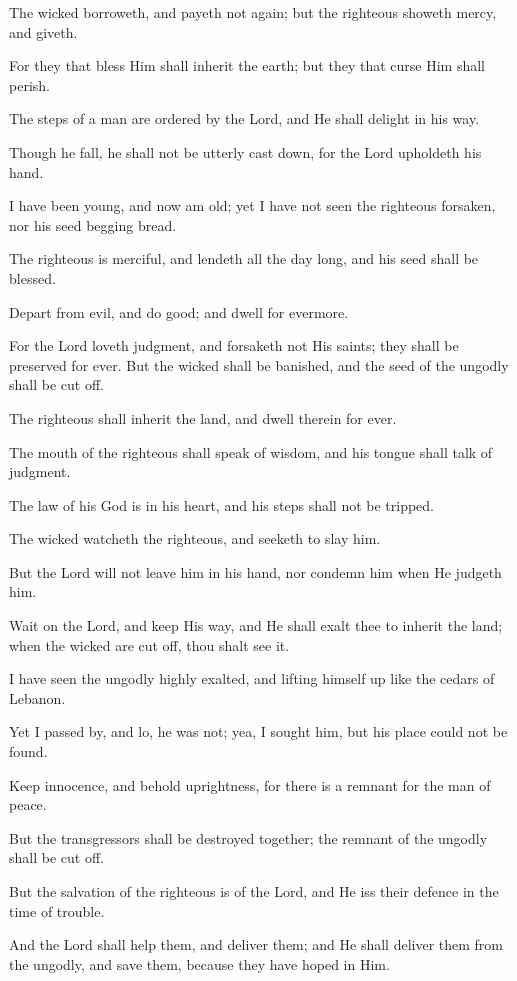 The wicked borroweth, and payeth not again; but the righteous showeth mercy, and giveth.

For they that bless Him shall inherit the earth; but they that curse Him shall perish.

The steps of a man are ordered by the Lord, and He shall delight in his way.

Though he fall, he shall not be utterly cast down, for the Lord upholdeth his hand.

I have been young, and now am old; yet I have not seen the righteous forsaken, nor his seed begging bread.

The righteous is merciful, and lendeth all the day long, and his seed shall be blessed.

Depart from evil, and do good; and dwell for evermore.

For the Lord loveth judgment, and forsaketh not His saints; they shall be preserved for ever. But the wicked shall be banished, and the seed of the ungodly shall be cut off.

The righteous shall inherit the land, and dwell therein for ever.

The mouth of the righteous shall speak of wisdom, and his tongue shall talk of judgment.

The law of his God is in his heart, and his steps shall not be tripped.

The wicked watcheth the righteous, and seeketh to slay him.

But the Lord will not leave him in his hand, nor condemn him when He judgeth him.

Wait on the Lord, and keep His way, and He shall exalt thee to inherit the land; when the wicked are cut off, thou shalt see it.

I have seen the ungodly highly exalted, and lifting himself up like the cedars of Lebanon.

Yet I passed by, and lo, he was not; yea, I sought him, but his place could not be found.

Keep innocence, and behold uprightness, for there is a remnant for the man of peace.

But the transgressors shall be destroyed together; the remnant of the ungodly shall be cut off.

But the salvation of the righteous is of the Lord, and He iss their defence in the time of trouble.

And the Lord shall help them, and deliver them; and He shall deliver them from the ungodly, and save them, because they have hoped in Him.
